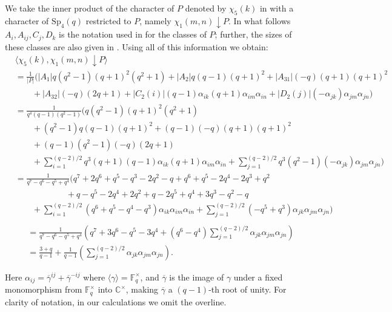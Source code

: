 \documentclass[10pt,a4paper]{amsart}
\theoremstyle{plain}
\theoremstyle{definition}
\numberwithin{equation}{section}
\begin{document}
We  take the inner product of the character of $P$ denoted by  $\chi_5(k)$ in  \cite{speven} with a character of $\mathrm{Sp}_4(q)$ restricted to $P$, namely $\chi_{1}(m, n)\downarrow P$. In what follows  $A_i,A_{ij}, C_j, D_k$ is the notation used  in \cite{speven} for the classes of $P$; further, the sizes of these classes are also given in \cite{speven}. Using all of this information we obtain:
\begin{align*}
&\langle \chi_5(k), \chi_1(m, n)\downarrow P\rangle\\&
=\frac{1}{|P|}\Big(
|A_1| q(q^2-1) (q+1)^2(q^2+1)
+|A_2| q(q-1) (q+1)^2 
+|A_{31}| (-q)(q+1) (q+1)^2\\
&\qquad + |A_{32}| (-q) (2q+1)
+|C_2(i)| (q-1)\alpha_{ik} (q+1)\alpha_{im}\alpha_{in} +|D_2(j)| (-\alpha_{jk}) \alpha_{jm}\alpha_{jn}
\Big)\\&
=\frac{1}{q^4(q-1)(q^2-1)}\Big(q(q^2-1) (q+1)^2(q^2+1)\\
&\qquad +(q^2-1) q(q-1) (q+1)^2
+(q-1) (-q)(q+1) (q+1)^2\\ 
&\qquad +(q-1)(q^2-1) (-q) (2q+1)\\ 
&\qquad +\sum_{i=1}^{(q-2)/2} q^3(q+1) (q-1)\alpha_{ik} (q+1)\alpha_{im}\alpha_{in}
+\sum_{j=1}^{(q-2)/2} q^3(q^2-1) (-\alpha_{jk}) \alpha_{jm}\alpha_{jn}\Big)\\
&=\frac{1}{q^7-q^6-q^5+q^4}\Big(q^7+2q^6+q^5-q^3-2q^2-q
 +q^6+q^5-2q^4-2q^3+q^2\\
 &\qquad \qquad \qquad +q
-q^5-2q^4+2q^2+q-2q^5+q^4+3q^3-q^2-q\\
&\qquad +\sum_{i=1}^{(q-2)/2} (q^6+q^5-q^4-q^3)\alpha_{ik}\alpha_{im}\alpha_{in}
+\sum_{j=1}^{(q-2)/2}(-q^5+q^3)\alpha_{jk}\alpha_{jm}\alpha_{jn}\Big)\\
\end{align*}
\begin{align*}&=
\frac{1}{q^7-q^6-q^5+q^4} \left(q^7+3q^6-q^5-3q^4+\left(q^6-q^4\right)\sum_{j=1}^{(q-2)/2} \alpha_{jk}\alpha_{jm}\alpha_{jn}\right)\\&
=\frac{3+q}{q-1}+\frac{1}{q-1}\left(\sum_{j=1}^{(q-2)/2} \alpha_{jk}\alpha_{jm}\alpha_{jn}\right).
\end{align*}

Here $\alpha_{ij} = \overline{\gamma}^{ij}+\overline{\gamma}^{-ij}$ where $\langle\gamma\rangle = \mathbb{F}_q^\times$, and $\overline{\gamma}$ is the image of $\gamma$ under a fixed monomorphism from $\mathbb{F}_q^\times$ into $\mathbb{C}^\times$, making $\overline{\gamma}$ a $(q-1)$-th root of unity. For clarity of notation, in our calculations we omit the overline.
\end{document}
